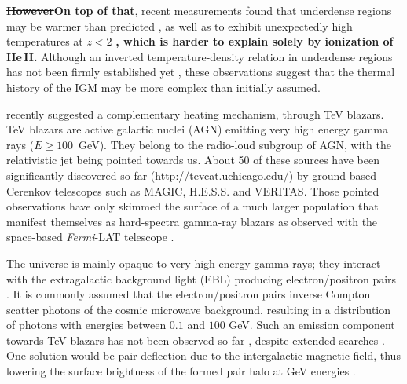 \documentclass[numberedappendix]{emulateapj}
\newcommand\ALc[1]{{\color{red} \bf #1}} %
\begin{document}
\ALc{\sout{However}On top of that}, recent measurements found that underdense regions may be warmer than predicted \citep{2009MNRAS.399L..39V,2008MNRAS.386.1131B}, as well as to exhibit unexpectedly high temperatures at $z<2$ \citep{2014MNRAS.441.1916B}\ALc{, which is harder to explain solely by ionization of He\,\textsc{II}.} Although an inverted temperature-density relation in underdense regions has not been firmly established yet \citep{2014MNRAS.438.2499B}, these observations suggest that the thermal history of the IGM may be more complex than initially assumed.

\citet{2012ApJ...752...22B} recently suggested a complementary heating mechanism, through TeV blazars. TeV blazars are active galactic nuclei (AGN) emitting very high energy gamma rays ($E\ge100$~GeV). They belong to the radio-loud subgroup of AGN, with the relativistic jet being pointed towards us. About 50 of these sources have been significantly discovered so far (http://tevcat.uchicago.edu/) by ground based Cerenkov telescopes such as MAGIC, H.E.S.S. and VERITAS. Those pointed observations have only skimmed the surface of a much larger population that manifest themselves as hard-spectra gamma-ray blazars as observed with the space-based \textit{Fermi}-LAT telescope \citep{2014ApJ...790..137B}. 

The universe is mainly opaque to very high energy gamma rays; they interact with the extragalactic background light (EBL) producing electron/positron pairs \citep{1967PhRv..155.1408G,1992ApJ...390L..49S}. It is commonly assumed that the electron/positron pairs inverse Compton scatter photons of the cosmic microwave background, resulting in a distribution of photons with energies between $0.1$ and $100$ GeV. Such an emission component towards TeV blazars has not been observed so far \citep{2010A&A...524A..77A}, despite extended searches \citep{2014A&A...562A.145H}. One solution would be pair deflection due to the intergalactic magnetic field, thus lowering the surface brightness of the formed pair halo at GeV energies \citep{2013A&ARv..21...62D,2012ApJ...747L..14V,2011ApJ...733L..21D}. 
\end{document}
